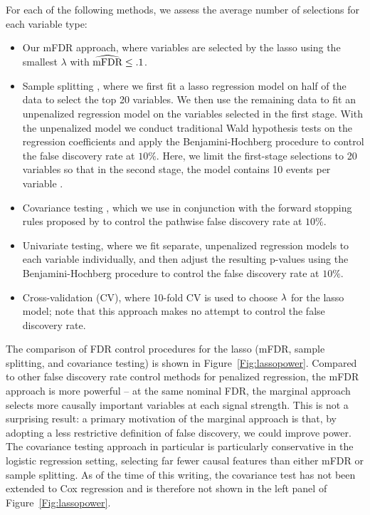 For each of the following methods, we assess the average number of selections for each variable type:
\begin{itemize}[labelindent=0.5cm, leftmargin=*]
\item Our mFDR approach, where variables are selected by the lasso using the smallest $\lambda$ with $\widehat{\textrm{mFDR}} \leq .1$.
\item Sample splitting \citep{Sample_Splitting}, where we first fit a lasso regression model on half of the data to select the top 20 variables. We then use the remaining data to fit an unpenalized regression model on the variables selected in the first stage. With the unpenalized model we conduct traditional Wald hypothesis tests on the regression coefficients and apply the Benjamini-Hochberg procedure \citep{BH_1995} to control the false discovery rate at $10\%$. Here, we limit the first-stage selections to 20 variables so that in the second stage, the model contains 10 events per variable \citep{peduzzi_epv}.
\item Covariance testing \citep{CovTest}, which we use in conjunction with the forward stopping rules proposed by \citet{GSell2016} to control the pathwise false discovery rate at $10\%$. 
\item Univariate testing, where we fit separate, unpenalized regression models to each variable individually, and then adjust the resulting p-values using the Benjamini-Hochberg procedure to control the false discovery rate at $10\%$.
\item Cross-validation (CV), where 10-fold CV is used to choose $\lambda$ for the lasso model; note that this approach makes no attempt to control the false discovery rate.
\end{itemize}

The comparison of FDR control procedures for the lasso (mFDR, sample splitting, and covariance testing) is shown in Figure~\ref{Fig:lassopower}.  Compared to other false discovery rate control methods for penalized regression, the mFDR approach is more powerful -- at the same nominal FDR, the marginal approach selects more causally important variables at each signal strength.  This is not a surprising result: a primary motivation of the marginal approach is that, by adopting a less restrictive definition of false discovery, we could improve power.  The covariance testing approach in particular is particularly conservative in the logistic regression setting, selecting far fewer causal features than either mFDR or sample splitting.  As of the time of this writing, the covariance test has not been extended to Cox regression and is therefore not shown in the left panel of Figure~\ref{Fig:lassopower}.

